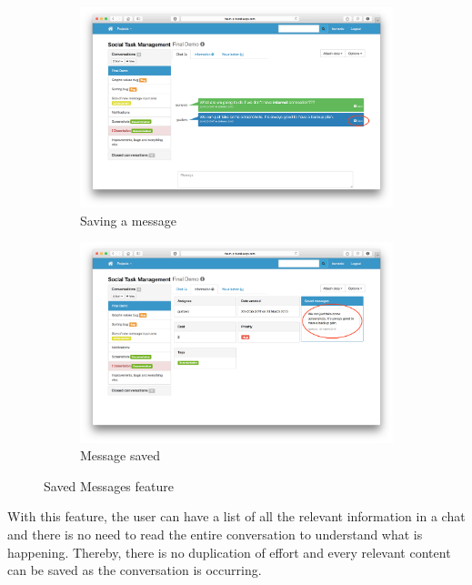 \documentclass[a4paper]{l3proj}
\begin{document}
\begin{figure}[ht]
    \centering
    \begin{subfigure}[b]{0.48\textwidth}
	    \centering
		\includegraphics[width=\textwidth]{saveMessage}
		\caption{Saving a message}
		\label{fig:saveMessage}        
    \end{subfigure}
    \begin{subfigure}[b]{0.48\textwidth}
        \centering
		\includegraphics[width=\textwidth]{messageSaved}
		\caption{Message saved}
		\label{fig:messageSaved} 
    \end{subfigure}    
    \caption{Saved Messages feature}
    \label{fig:feature}
\end{figure}

With this feature, the user can have a list of all the relevant information in a chat and there is no need to read the entire conversation to understand what is happening. Thereby, there is no duplication of effort and every relevant content can be saved as the conversation is occurring.
\end{document}
